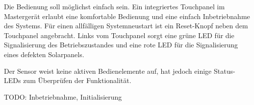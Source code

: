 Die  Bedienung  soll  m\"oglichst einfach  sein. Ein  integriertes  Touchpanel
im  Masterger\"at   erlaubt  eine  komfortable  Bedienung   und  eine  einfach
Inbetriebnahme des  Systems. F\"ur einen allf\"alligen Systemneustart  ist ein
Reset-Knopf neben  dem Touchpanel angebracht. Links vom  Touchpanel sorgt eine
gr\"une LED f\"ur  die Signalisierung des Betriebszustandes und  eine rote LED
f\"ur die Signalisierung eines defekten Solarpanels.

Der  Sensor  weist  keine  aktiven   Bedienelemente  auf,  hat  jedoch  einige
Status-LEDs zum \"Uberpr\"ufen der Funktionalit\"at.

\textsc{TODO}: Inbetriebnahme, Initialisierung
